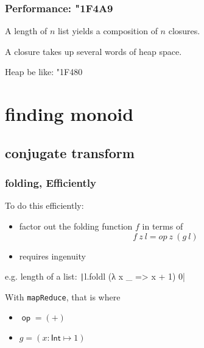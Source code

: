 \documentclass{beamer}
\DeclareMathOperator{\op}{\mathsf{op}}
\begin{document}
\begin{frame}
    \frametitle{Performance: {\char"1F4A9}}
    A length of $n$ list yields a composition of $n$ closures.

    A closure takes up several words of heap space.

    Heap be like: {\char"1F480}

\end{frame}
\section{finding monoid}
\subsection{conjugate transform}
\begin{frame}
    \frametitle{folding, Efficiently}
    To do this efficiently:
    \begin{itemize}
        \item factor out the folding function $f$ in terms of
              \begin{equation*}
                  f\ z\ l = op\ z\ (g\ l)
              \end{equation*}
        \item requires ingenuity
    \end{itemize}
    e.g. length of a list: \texttt|l.foldl (λ x _ => x + 1) 0|

    With \texttt{mapReduce}, that is
    where
    \begin{itemize}
        \item $\op = (+)$
        \item $g = (x: \mathsf{Int}\mapsto 1)$
    \end{itemize}
\end{frame}
\end{document}
